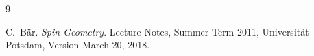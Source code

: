 \documentclass[10pt, letterpaper]{article}
\begin{document}
\begin{thebibliography}{9}

C.~Bär.
\textit{Spin Geometry}.
Lecture Notes, Summer Term 2011,
Universität Potsdam,
Version March 20, 2018.

\end{thebibliography}
\end{document}
